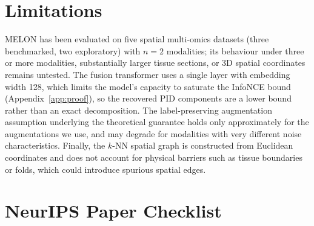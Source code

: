 \documentclass{article}
\theoremstyle{plain}
\theoremstyle{definition}
\begin{document}

\section{Limitations}\label{app:limitations}

MELON has been evaluated on five spatial multi-omics datasets (three benchmarked, two exploratory) with $n=2$ modalities; its behaviour under three or more modalities, substantially larger tissue sections, or 3D spatial coordinates remains untested. The fusion transformer uses a single layer with embedding width 128, which limits the model's capacity to saturate the InfoNCE bound (Appendix~\ref{app:proof}), so the recovered PID components are a lower bound rather than an exact decomposition. The label-preserving augmentation assumption underlying the theoretical guarantee holds only approximately for the augmentations we use, and may degrade for modalities with very different noise characteristics. Finally, the $k$-NN spatial graph is constructed from Euclidean coordinates and does not account for physical barriers such as tissue boundaries or folds, which could introduce spurious spatial edges.

\newpage
\section*{NeurIPS Paper Checklist}
\end{document}
